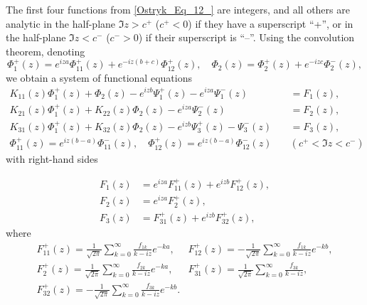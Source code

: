 The first four functions from \eqref{Ostryk_Eq_12_} are integers, and all others are analytic in the half-plane $\Im z>c^{+} $ ($c^{+} <0$) if they have a superscript ``+'', or in the half-plane $\Im z<c^{-} $ ($c^{-} >0$) if their superscript is ``--''. Using the convolution theorem, denoting
\begin{equation} \label{Ostryk_Eq_13_} 
\Phi _{1}^{+} (z)=e^{iza} \Phi _{11}^{+} (z)+e^{-iz(b+c)} \Phi _{12}^{+} (z), \quad   \Phi _{2} (z)=\Phi _{2}^{+} (z)+e^{-izc} \Phi _{2}^{-} (z),  
\end{equation} 
we obtain a system of functional equations
\begin{equation} \label{Ostryk_Eq_14_} 
\begin{aligned}
	K_{11} (z)\Phi _{1}^{+} (z)+\Phi _{2} (z)-e^{izb} \Psi _{1}^{+} (z)-e^{iza} \Psi _{1}^{-} (z)&=F_{1} (z),
	\\
	K_{21} (z)\Phi _{1}^{+} (z)+K_{22} (z)\Phi _{2} (z)-e^{iza} \Psi _{2}^{-} (z)&=F_{2} (z),
	\\
	K_{31} (z)\Phi _{1}^{+} (z)+K_{32} (z)\Phi _{2} (z)-e^{izb} \Psi _{3}^{+} (z)-\Psi _{3}^{-} (z)&=F_{3} (z),
	\\
	\Phi _{11}^{+} (z)=e^{iz(b-a)} \Phi _{11}^{-} (z),  \quad  \Phi _{12}^{+} (z)=e^{iz(b-a)} \Phi _{12}^{-} (z)  \quad & (c^{+} <\Im z<c^{-} )  
\end{aligned}
\end{equation} 
with right-hand sides

\begin{equation} \label{Ostryk_Eq_15_} 
\begin{aligned}
	F_{1} (z)&=e^{iza} F_{11}^{+} (z)+e^{izb} F_{12}^{+} (z), 
	\\
	F_{2} (z)&=e^{iza} F_{2}^{+} (z), 
	\\
	F_{3} (z)&=F_{31}^{+} (z)+e^{izb} F_{32}^{+} (z),
\end{aligned}
\end{equation} 
where
\[
\begin{array}{ll}
F_{11}^{+} (z)=\frac{1}{\sqrt{2\pi } } \displaystyle\sum\limits_{k=0}^{\infty }\frac{f_{1k} }{k-iz} e^{-ka}  ,  &  F_{12}^{+} (z)=-\frac{1}{\sqrt{2\pi } } \displaystyle\sum\limits_{k=0}^{\infty }\frac{f_{1k} }{k-iz} e^{-kb}  ,
\\
F_{2}^{+} (z)=\frac{1}{\sqrt{2\pi } } \displaystyle\sum\limits_{k=0}^{\infty }\frac{f_{2k} }{k-iz} e^{-ka}  ,  &  F_{31}^{+} (z)=\frac{1}{\sqrt{2\pi } } \displaystyle\sum\limits_{k=0}^{\infty }\frac{f_{3k} }{k-iz}  ,
\\
F_{32}^{+} (z)=-\frac{1}{\sqrt{2\pi } } \displaystyle\sum\limits_{k=0}^{\infty }\frac{f_{3k} }{k-iz} e^{-kb}  .  
\end{array}
\]

